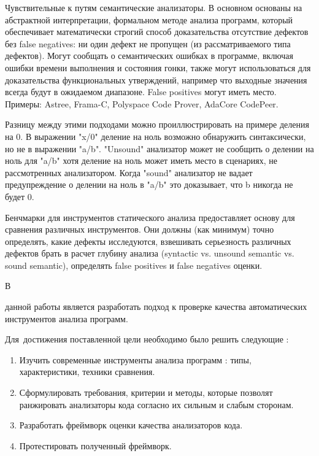 Чувствительные к путям семантические анализаторы. В основном основаны на абстрактной 
интерпретации, формальном методе анализа программ, который обеспечивает математически
строгий способ доказательства отсутствие дефектов без false negatives: ни один дефект 
не пропущен (из рассматриваемого типа дефектов). Могут сообщать о 
семантических ошибках в программе, включая ошибки времени выполнения и состояния гонки,
также могут использоваться для доказательства функциональных утверждений, например что 
выходные значения всегда будут в ожидаемом диапазоне. False positives могут иметь место. 
Примеры: Astree\cite{Astree},
Frama-C\cite{Frama}, Polyspace Code Prover\cite{Polyspace2prover}, 
AdaCore CodePeer\cite{Codepeer}.

Разницу между этими подходами можно проиллюстрировать на примере деления на 0. В выражении 
"x/0" деление на ноль возможно обнаружить синтаксически, но не в выражении "a/b". "Unsound" анализатор 
может не сообщить о делении на ноль для "a/b" хотя деление на ноль может иметь место в сценариях,
не рассмотренных анализатором. Когда "sound" анализатор не вадает предупреждение о делении на ноль
в "a/b" это доказывает, что b никогда не будет 0. 

Бенчмарки для инструментов статического анализа предоставляет основу для сравнения
различных инструментов. Они должны (как минимум) точно определять, какие дефекты исследуются,
взвешивать серьезность различных дефектов %
брать в расчет глубину анализа (syntactic vs. unsound semantic vs. sound semantic), определять
false positives и false negatives оценки.

В 



{\aim} данной работы является разработать подход к проверке качества автоматических инструментов анализа программ.

Для~достижения поставленной цели необходимо было решить следующие {\tasks}:
\begin{enumerate}[beginpenalty=10000] %
  \item Изучить современные инструменты анализа программ : типы, характеристики, техники сравнения.  
  \item Сформулировать требования, критерии и методы, которые позволят ранжировать анализаторы кода
      согласно их сильным и слабым сторонам.
  \item Разработать фреймворк оценки качества анализаторов кода. 
  \item Протестировать полученный фреймворк.
\end{enumerate}


